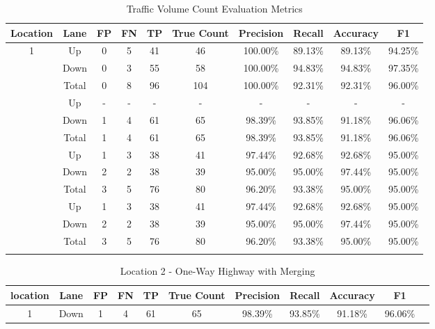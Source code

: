 \begin{table}
    \centering
    \begin{tabular}{|cccccccccc|} 
    \hline
    \textbf{Location} & \textbf{Lane} & \textbf{FP} & \textbf{FN}& \textbf{TP}& \textbf{True Count}&\textbf{Precision}& \textbf{Recall}& \textbf{Accuracy} & \textbf{F1}\\
    \hline
    \multirow{3}{4em}{1}  
    &Up&0&5&41&46&100.00\%&89.13\%&89.13\%&94.25\%\\\cline{2-10}
    &Down&0&3&55&58&100.00\%&94.83\%&94.83\%&97.35\%\\\cline{2-10}
    &Total&0&8&96&104&100.00\%&92.31\%&92.31\%&96.00\%\\\Xhline{1pt}

    \multirow{3}{4em}{2}
    &Up&-&-&-&-&-&-&-&-\\\cline{2-10}
    &Down&1&4&61&65&98.39\%&93.85\%&91.18\%&96.06\%\\\cline{2-10}
    &Total&1&4&61&65&98.39\%&93.85\%&91.18\%&96.06\%\\\Xhline{1pt}

    \multirow{3}{4em}{3}
    &Up&1&3&38&41&97.44\%&92.68\%&92.68\%&95.00\%\\\cline{2-10}
    &Down&2&2&38&39&95.00\%&95.00\%&97.44\%&95.00\%\\\cline{2-10}
    &Total&3&5&76&80&96.20\%&93.38\%&95.00\%&95.00\%\\\Xhline{1pt}

    \multirow{3}{4em}{4}
    &Up&1&3&38&41&97.44\%&92.68\%&92.68\%&95.00\%\\\cline{2-10}
    &Down&2&2&38&39&95.00\%&95.00\%&97.44\%&95.00\%\\\cline{2-10}
    &Total&3&5&76&80&96.20\%&93.38\%&95.00\%&95.00\%\\\Xhline{1pt}


    
\end{tabular}
\caption{Traffic Volume Count Evaluation Metrics}
\end{table}
\raggedbottom

\begin{table}
    \centering
    \begin{tabular}{|c|c|c|c|c|c|c|c|c|c|c|} 
    \hline
    location & \textbf{Lane} & \textbf{FP} & \textbf{FN}& \textbf{TP}& \textbf{True Count}& 
    \textbf{Precision}& \textbf{Recall}& \textbf{Accuracy} & \textbf{F1}\\
    \hline
    1&Down&1&4&61&65&98.39\%&93.85\%&91.18\%&96.06\%\\
    \hline
\end{tabular}
\caption{Location 2 - One-Way Highway with Merging}
\end{table}
\raggedbottom

